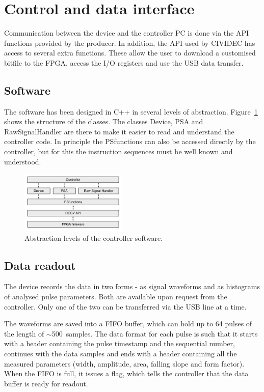 \section{Control and data interface}
Communication between the device and the controller PC is done via the API functions provided by the producer. In addition, the API used by CIVIDEC has access to several extra functions. These allow the user to download a customised bitfile to the FPGA, access the I/O registers and use the USB data transfer.

\subsection{Software}
The software has been designed in C++ in several levels of abstraction. Figure~\ref{fig:controller} shows the structure of the classes. The classes Device, PSA and RawSignalHandler are there to make it easier to read and understand the controller code. In principle the PSfunctions can also be accessed directly by the controller, but for this the instruction sequences must be well known and understood. 

\begin{figure}[!t]
\centering
\includegraphics[width=0.45\textwidth]{05_current_monitoring/plots/controller}
\caption{Abstraction levels of the controller software.}
\label{fig:controller}
\end{figure}

\subsection{Data readout}
The device records the data in two forms - as signal waveforms and as histograms of analysed pulse parameters. Both are available upon request from the controller. Only one of the two can be transferred via the USB line at a time. 

The waveforms are saved into a FIFO buffer, which can hold up to 64 pulses of the length of $\sim$500~samples. The data format for each pulse is such that it starts with a header containing the pulse timestamp and the sequential number, continues with the data samples and ends with a header containing all the measured parameters (width, amplitude, area, falling slope and form factor). When the FIFO is full, it issues a flag, which tells the controller that the data buffer is ready for readout. 

